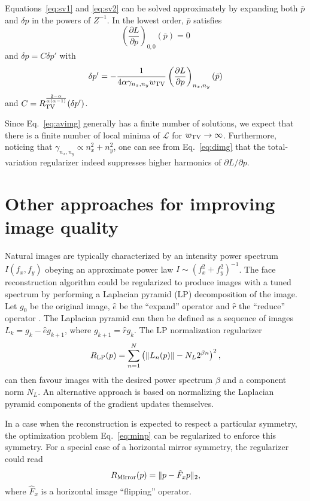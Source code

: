 \documentclass{article}
\def\Img{p}
\def\Reg{R}
\def\RegM{\Reg_{\rm Mirror}}
\def\RegLP{\Reg_{\rm LP}}
\def\wtv{w_{\rm TV}}
\newcommand{\op}[1]{\hat{#1}}
\def\MirrorOp{\op{F}_x}
\def\LPComponent{L}
\def\LPNorm{N_L}
\newcommand{\mc}[1]{\mathcal{#1}}
\newcommand{\Eq}[1]{Eq.~\eqref{#1}}
\newcommand{\pd}[2]{\frac{\partial #1}{\partial #2}}
\newcommand{\pld}[2]{{{\partial} #1}/{{\partial} #2}}
\begin{document}
{    Equations~\eqref{eq:sv1} and \eqref{eq:sv2} can be solved approximately by expanding both $\bar{\Img}$ and $\delta \Img$ in the powers of $Z^{-1}$.
    In the lowest order, $\bar{\Img}$ satisfies
    \begin{equation}
      \label{eq:avimg}
      \left(\pd{L}{\Img}\right)_{0,0}(\bar{\Img}) = 0
    \end{equation}
    and $\delta \Img = C\delta \Img'$ with
    \begin{equation}
      \label{eq:dimg}
      \delta \Img' = -\frac{1}{4 \alpha \gamma_{n_x,n_y} \wtv} \left(\pd{L}{\Img}\right)_{n_x,n_y} (\bar{\Img})
    \end{equation}
    and $C = R_{\rm TV}^{\frac{2-\alpha}{\alpha(\alpha-1)}}(\delta p')$.

    Since \Eq{eq:avimg} generally has a finite number of solutions, we expect that there is a finite number of local minima of $\mc{L}$ for $\wtv\to \infty$.
    Furthermore, noticing that $\gamma_{n_x,n_y} \propto n_x^2 + n_y^2$, one can see from \Eq{eq:dimg} that the total-variation regularizer indeed suppresses higher harmonics of $\pld{L}{\Img}$.


  \section{Other approaches for improving image quality}
  \label{sec:regrest}

    Natural images are typically characterized by an intensity power spectrum $I(f_x,f_y)$ obeying \cite{schaaf:96} an approximate power law $I\sim (f_x^2+f_y^2)^{-1}$.
    The face reconstruction algorithm could be regularized to produce images with a tuned spectrum by performing a Laplacian pyramid (LP) decomposition \cite{burt:83} of the image.
    Let $g_0$ be the original image, $\op{e}$ be the ``expand'' operator and $\op{r}$ the ``reduce'' operator \cite{burt:83}.
    The Laplacian pyramid can then be defined as a sequence of images $L_k = g_k - \op{e} g_{k+1}$, where $g_{k+1} = \op{r} g_k$.
    The LP normalization regularizer
    \begin{equation}
      \label{eq:rlp}
      \RegLP(\Img) = \sum_{n=1}^{N} \left( \| \LPComponent_n(p) \| - \LPNorm 2^{\beta n}\right)^2,
    \end{equation}
    can then favour images with the desired power spectrum $\beta$ and a component norm $\LPNorm$.
    An alternative approach is based on normalizing the Laplacian pyramid components of the gradient updates themselves.

    In a case when the reconstruction is expected to respect a particular symmetry, the optimization problem \Eq{eq:minp} can be regularized to enforce this symmetry.
    For a special case of a horizontal mirror symmetry, the regularizer could read
    \begin{equation*}
      \RegM(\Img) = \| \Img - \MirrorOp \Img\|_2,
    \end{equation*}
    where $\MirrorOp$ is a horizontal image ``flipping'' operator.
}
\end{document}
